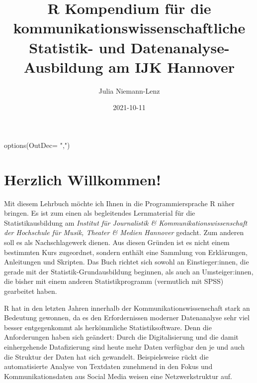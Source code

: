 \documentclass[
]{book}
\title{R Kompendium für die kommunikationswissenschaftliche Statistik- und Datenanalyse-Ausbildung am IJK Hannover}
\author{Julia Niemann-Lenz}
\date{2021-10-11}
\newenvironment{Shaded}{\begin{snugshade}}{\end{snugshade}}
\newcommand{\AttributeTok}[1]{\textcolor[rgb]{0.77,0.63,0.00}{#1}}
\newcommand{\FunctionTok}[1]{\textcolor[rgb]{0.00,0.00,0.00}{#1}}
\newcommand{\NormalTok}[1]{#1}
\newcommand{\StringTok}[1]{\textcolor[rgb]{0.31,0.60,0.02}{#1}}
\begin{document}
\maketitle

{
\setcounter{tocdepth}{1}
\tableofcontents
}
\begin{Shaded}
\begin{Highlighting}[]
\FunctionTok{options}\NormalTok{(}\AttributeTok{OutDec=} \StringTok{","}\NormalTok{)}
\end{Highlighting}
\end{Shaded}

\hypertarget{herzlich-willkommen}{%
\chapter*{Herzlich Willkommen!}\label{herzlich-willkommen}}

Mit diesem Lehrbuch möchte ich Ihnen in die Programmiersprache R näher bringen. Es ist zum einen als begleitendes Lernmaterial für die Statistikausbildung am \emph{Institut für Journalistik \& Kommunikationswissenschaft der Hochschule für Musik, Theater \& Medien Hannover} gedacht. Zum anderen soll es als Nachschlagewerk dienen. Aus diesen Gründen ist es nicht einem bestimmten Kurs zugeordnet, sondern enthält eine Sammlung von Erklärungen, Anleitungen und Skripten. Das Buch richtet sich sowohl an Einstieger:innen, die gerade mit der Statistik-Grundausbildung beginnen, als auch an Umsteiger:innen, die bisher mit einem anderen Statistikprogramm (vermutlich mit SPSS) gearbeitet haben.

R hat in den letzten Jahren innerhalb der Kommunikationswissenschaft stark an Bedeutung gewonnen, da es den Erfordernissen moderner Datenanalyse sehr viel besser entgegenkommt als herkömmliche Statistiksoftware. Denn die Anforderungen haben sich geändert: Durch die Digitalisierung und die damit einhergehende Datafizierung sind heute mehr Daten verfügbar den je und auch die Struktur der Daten hat sich gewandelt. Beispielsweise rückt die automatisierte Analyse von Textdaten zunehmend in den Fokus und Kommunikationsdaten aus Social Media weisen eine Netzwerkstruktur auf.
\end{document}
